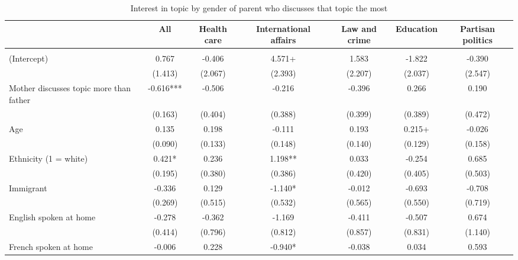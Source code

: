 \documentclass[
  letterpaper,
  DIV=11,
  numbers=noendperiod]{scrreprt}
\begin{document}
\begin{table}

\caption{Interest in topic by gender of parent who discusses that topic the most }
\centering
\fontsize{6}{8}\selectfont
\begin{tabular}[t]{lcccccc}
\toprule
  & All & Health care & International affairs & Law and crime & Education & Partisan politics\\
\midrule
\addlinespace[0.5em]
\multicolumn{7}{l}{\textit{Boys}}\\
\midrule \hspace{1em}(Intercept) & 0.767 & -0.406 & 4.571+ & 1.583 & -1.822 & -0.390\\
\hspace{1em} & (1.413) & (2.067) & (2.393) & (2.207) & (2.037) & (2.547)\\
\hspace{1em}Mother discusses topic more than father & -0.616*** & -0.506 & -0.216 & -0.396 & 0.266 & 0.190\\
\hspace{1em} & (0.163) & (0.404) & (0.388) & (0.399) & (0.389) & (0.472)\\
\hspace{1em}Age & 0.135 & 0.198 & -0.111 & 0.193 & 0.215+ & -0.026\\
\hspace{1em} & (0.090) & (0.133) & (0.148) & (0.140) & (0.129) & (0.158)\\
\hspace{1em}Ethnicity (1 = white) & 0.421* & 0.236 & 1.198** & 0.033 & -0.254 & 0.685\\
\hspace{1em} & (0.195) & (0.380) & (0.386) & (0.420) & (0.405) & (0.503)\\
\hspace{1em}Immigrant & -0.336 & 0.129 & -1.140* & -0.012 & -0.693 & -0.708\\
\hspace{1em} & (0.269) & (0.515) & (0.532) & (0.565) & (0.550) & (0.719)\\
\hspace{1em}English spoken at home & -0.278 & -0.362 & -1.169 & -0.411 & -0.507 & 0.674\\
\hspace{1em} & (0.414) & (0.796) & (0.812) & (0.857) & (0.831) & (1.140)\\
\hspace{1em}French spoken at home & -0.006 & 0.228 & -0.940* & -0.038 & 0.034 & 0.593\\

\end{tabular}
\end{table}
\end{document}

